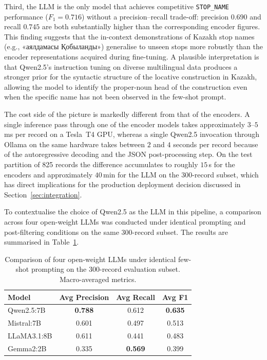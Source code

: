 Third, the LLM is the only model that achieves competitive \texttt{STOP\_NAME} performance ($F_1 = 0.716$) without a precision--recall trade-off: precision $0.690$ and recall $0.745$ are both substantially higher than the corresponding encoder figures. This finding suggests that the in-context demonstrations of Kazakh stop names (e.g., \foreignlanguage{russian}{«аялдамасы Қобыланды»}) generalise to unseen stops more robustly than the encoder representations acquired during fine-tuning. A plausible interpretation is that Qwen2.5's instruction tuning on diverse multilingual data produces a stronger prior for the syntactic structure of the locative construction in Kazakh, allowing the model to identify the proper-noun head of the construction even when the specific name has not been observed in the few-shot prompt.

The cost side of the picture is markedly different from that of the encoders. A single inference pass through one of the encoder models takes approximately $3$--$5$\,ms per record on a Tesla~T4 GPU, whereas a single Qwen2.5 invocation through Ollama on the same hardware takes between $2$ and $4$ seconds per record because of the autoregressive decoding and the JSON post-processing step. On the test partition of 825 records the difference accumulates to roughly $15$\,s for the encoders and approximately $40$\,min for the LLM on the 300-record subset, which has direct implications for the production deployment decision discussed in Section~\ref{sec:integration}.

To contextualise the choice of Qwen2.5 as the LLM in this pipeline, a comparison across four open-weight LLMs was conducted under identical prompting and post-filtering conditions on the same 300-record subset. The results are summarised in Table~\ref{tab:llmcomp}.

\begin{table}[H]
\centering
\caption{Comparison of four open-weight LLMs under identical few-shot prompting on the 300-record evaluation subset. Macro-averaged metrics.}
\label{tab:llmcomp}
\renewcommand{\arraystretch}{1.3}
\begin{tabular}{lccc}
\toprule
\textbf{Model} & \textbf{Avg Precision} & \textbf{Avg Recall} & \textbf{Avg F1} \\
\midrule
Qwen2.5:7B  & \textbf{0.788} & 0.612 & \textbf{0.635} \\
Mistral:7B  & 0.601 & 0.497 & 0.513 \\
LLaMA3.1:8B & 0.611 & 0.441 & 0.483 \\
Gemma2:2B   & 0.335 & \textbf{0.569} & 0.399 \\
\bottomrule
\end{tabular}
\end{table}

